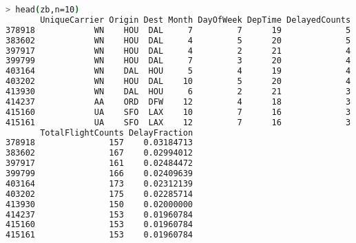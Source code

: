 \documentclass{article}\usepackage[]{graphicx}\usepackage[]{color}
\begin{document}
\begin{lstlisting}[language=bash,caption={Timing for all\_preprocess.sh}]
> head(zb,n=10)
       UniqueCarrier Origin Dest Month DayOfWeek DepTime DelayedCounts
378918            WN    HOU  DAL     7         7      19             5
383602            WN    HOU  DAL     4         5      20             5
397917            WN    HOU  DAL     4         2      21             4
399799            WN    HOU  DAL     7         3      20             4
403164            WN    DAL  HOU     5         4      19             4
403202            WN    HOU  DAL    10         5      20             4
413930            WN    DAL  HOU     6         2      21             3
414237            AA    ORD  DFW    12         4      18             3
415160            UA    SFO  LAX    10         7      16             3
415161            UA    SFO  LAX    12         7      16             3
       TotalFlightCounts DelayFraction
378918               157    0.03184713
383602               167    0.02994012
397917               161    0.02484472
399799               166    0.02409639
403164               173    0.02312139
403202               175    0.02285714
413930               150    0.02000000
414237               153    0.01960784
415160               153    0.01960784
415161               153    0.01960784
\end{lstlisting}

\section{}
\end{document}
